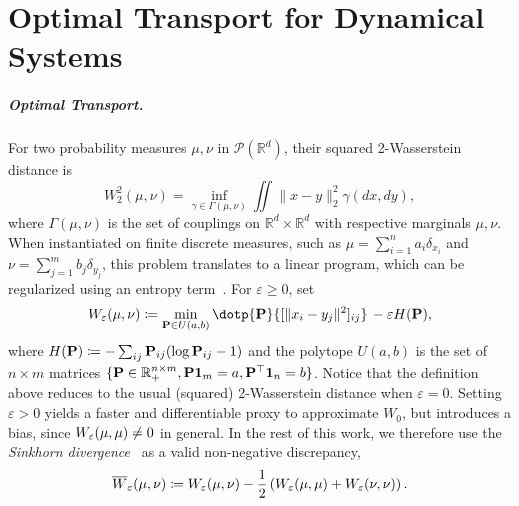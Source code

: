 \chapter{Optimal Transport for Dynamical Systems}
\label{cha:ot_background}

%


\paragraph{Optimal Transport.} 
For two probability measures $\mu, \nu$ in $\mathcal{P}(\mathbb{R}^d)$, their squared 2-Wasserstein distance is
\begin{equation} \label{eq:ot}
    W_2^2(\mu, \nu) = \inf_{\gamma\in \Gamma(\mu,\nu)}\iint \|x-y\|^2_2 \gamma(dx, dy),
\end{equation}
where $\Gamma(\mu, \nu)$ is the set of couplings on $\mathbb{R}^d\times\mathbb{R}^d$ with respective marginals $\mu, \nu$. When instantiated on finite discrete measures, such as $\mu=\sum_{i=1}^n a_i\delta_{x_i}$ and $\nu=\sum_{j=1}^m b_j\delta_{y_j}$, this problem translates to a linear program, which can be regularized using an entropy term~\citep{cuturi2013sinkhorn,peyre2019computational}. For $\varepsilon\geq0$, set 
\begin{equation}\label{eq:reg-ot}
\We(\mu,\nu) \defeq \min_{\bP\in U(a,b)} \dotp{\bP}{[\|x_i - y_j\|^2]_{ij}}  \,-\varepsilon H(\bP),
\end{equation}
where $H(\mathbf{P}) \coloneqq -\sum_{ij} \mathbf{P}_{ij} (\log \mathbf{P}_{ij} - 1)$ and the polytope $U(a,b)$ is the set of $n\times m$ matrices $\{\mathbf{P}\in\mathbb{R}^{n \times m}_+, \mathbf{P}\mathbf{1}_m =a, \mathbf{P}^\top\mathbf{1}_n=b\}$. 
Notice that the definition above reduces to the usual (squared) 2-Wasserstein distance when $\varepsilon=0$. Setting $\varepsilon>0$ yields a faster and differentiable proxy to approximate $W_{0}$, but introduces a bias, since $W_{\varepsilon}(\mu,\mu)\ne 0$ in general. %
In the rest of this work, we therefore use the \textit{Sinkhorn divergence}~\citep{ramdas2017wasserstein,genevay2018,salimans2018improving,feydy2018interpolating} as %
a valid non-negative discrepancy,
\begin{equation} \label{eq:sinkhorn}
\overline{W}_{\varepsilon}(\mu,\nu) \coloneqq W_{\varepsilon}(\mu,\nu)-\frac{1}{2}\left(W_{\varepsilon}(\mu,\mu)+W_{\varepsilon}(\nu,\nu)\right).\\
\end{equation}

